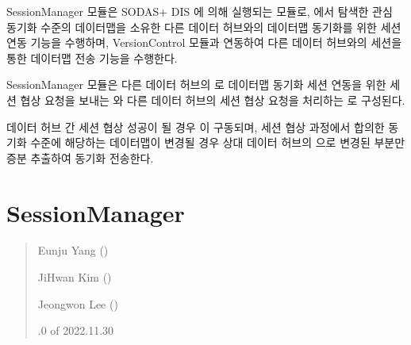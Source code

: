 \documentclass[a4paper,10pt,english]{sphinxmanual}
\begin{document}
\sphinxAtStartPar
SessionManager 모듈은 SODAS+ DIS {\hyperref[\detokenize{_DHDaemon:dhdaemon}]{}} 에 의해 실행되는 모듈로, {\hyperref[\detokenize{_DHSearch:dhsearch}]{}} 에서 탐색한 관심 동기화 수준의 데이터맵을 소유한 다른 데이터 허브와의 데이터맵 동기화를 위한 세션 연동 기능을 수행하며, VersionControl 모듈과 연동하여 다른 데이터 허브와의 세션을 통한 데이터맵 전송 기능을 수행한다.

\sphinxAtStartPar
SessionManager 모듈은 다른 데이터 허브의 {\hyperref[\detokenize{_SessionListener:sessionlistener}]{}} 로 데이터맵 동기화 세션 연동을 위한 세션 협상 요청을 보내는 {\hyperref[\detokenize{_SessionRequester:sessionrequester}]{}} 와 다른 데이터 허브의 세션 협상 요청을 처리하는 {\hyperref[\detokenize{_SessionListener:sessionlistener}]{}} 로 구성된다.

\sphinxAtStartPar
데이터 허브 간 세션 협상 성공이 될 경우 {\hyperref[\detokenize{_Session:session}]{}} 이 구동되며, 세션 협상 과정에서 합의한 동기화 수준에 해당하는 데이터맵이 변경될 경우 상대 데이터 허브의 {\hyperref[\detokenize{_Session:session}]{}} 으로 변경된 부분만 증분 추출하여 동기화 전송한다.

\begin{DUlineblock}{0em}
\item[] 
\end{DUlineblock}

\sphinxstepscope


\section{SessionManager}
\label{\detokenize{_SessionManager:sessionmanager}}\label{\detokenize{_SessionManager:id1}}\label{\detokenize{_SessionManager::doc}}\begin{quote}\begin{description}
\begin{DUlineblock}{0em}
\item[] Eunju Yang ()
\item[] JiHwan Kim ()
\item[] Jeongwon Lee ()
\end{DUlineblock}

.0 of 2022.11.30

\end{description}\end{quote}
\end{document}

